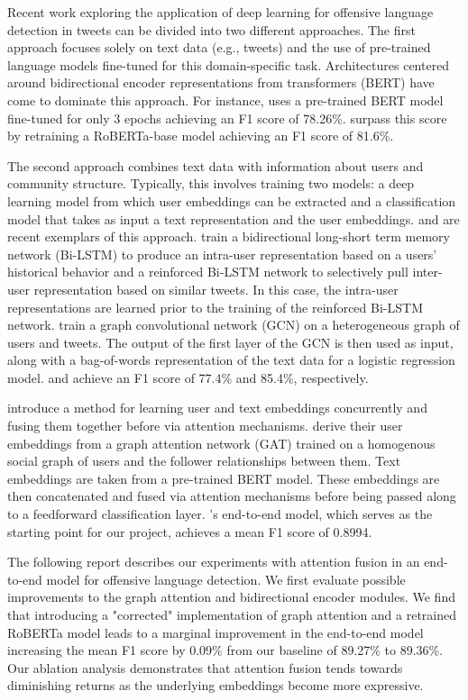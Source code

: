 \documentclass[letterpaper]{article} %
\begin{document}
Recent work exploring the application of deep learning for offensive language detection in tweets can be divided into two different approaches. The first approach focuses solely on text data (e.g., tweets) and the use of pre-trained language models fine-tuned for this domain-specific task. Architectures centered around bidirectional encoder representations from transformers (BERT) have come to dominate this approach. For instance, \citet{liu2019-nuli} uses a pre-trained BERT model fine-tuned for only 3 epochs achieving an F1 score of 78.26\%. \citet{Barbieri2020} surpass this score by retraining a RoBERTa-base model achieving an F1 score of 81.6\%.

The second approach combines text data with information about users and community structure. Typically, this involves training two models: a deep learning model from which user embeddings can be extracted and a classification model that takes as input a text representation and the user embeddings. \citet{qian-etal-2018-leveraging} and \citet{Mishra2019} are recent exemplars of this approach. \citet{qian-etal-2018-leveraging} train a bidirectional long-short term memory network (Bi-LSTM) to produce an intra-user representation based on a users' historical behavior and a reinforced Bi-LSTM network to selectively pull inter-user representation based on similar tweets. In this case, the intra-user representations are learned prior to the training of the reinforced Bi-LSTM network. \citet{Mishra2019} train a graph convolutional network (GCN) on a heterogeneous graph of users and tweets. The output of the first layer of the GCN is then used as input, along with a bag-of-words representation of the text data for a logistic regression model. \citet{qian-etal-2018-leveraging} and \citet{Mishra2019} achieve an F1 score of 77.4\% and 85.4\%, respectively.

\citet{Miao2022} introduce a method for learning user and text embeddings concurrently and fusing them together before via attention mechanisms. \citet{Miao2022} derive their user embeddings from a graph attention network (GAT) trained on a homogenous social graph of users and the follower relationships between them. Text embeddings are taken from a pre-trained BERT model. These embeddings are then concatenated and fused via attention mechanisms before being passed along to a feedforward classification layer. \citet{Miao2022}'s end-to-end model, which serves as the starting point for our project, achieves a mean F1 score of 0.8994.

The following report describes our experiments with attention fusion in an end-to-end model for offensive language detection. We first evaluate possible improvements to the graph attention and bidirectional encoder modules. We find that introducing a "corrected" implementation of graph attention and a retrained RoBERTa model leads to a marginal improvement in the end-to-end model increasing the mean F1 score by 0.09\% from our baseline of 89.27\% to 89.36\%. Our ablation analysis demonstrates that attention fusion tends towards diminishing returns as the underlying embeddings become more expressive.
\end{document}
